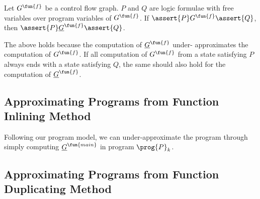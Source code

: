 \begin{proposition}
  Let $G^\fun{f}$ be a control flow graph. $P$ and $Q$ are logic formulae with
  free variables over program variables of $G^\fun{f}$. If $\assert{P}
  G^\fun{f} \assert{Q}$, then 
  $\assert{P} \underline{G}^\fun{f} \assert{Q}$.
\end{proposition}
The above holds because the computation of $\underline{G}^\fun{f}$ under-
approximates the computation of $G^\fun{f}$.
If all computation of $G^\fun{f}$ from a state satisfying $P$ always ends with
a state satisfying $Q$,
the same should also hold for the computation of $\underline{G}^\fun{f}$.


\subsection{Approximating Programs from Function Inlining Method}
Following our program model, we can under-approximate the program through simply
computing $\underline{G}^\fun{main}$ in program $\prog{P}_k$.


\subsection{Approximating Programs from Function Duplicating Method}

